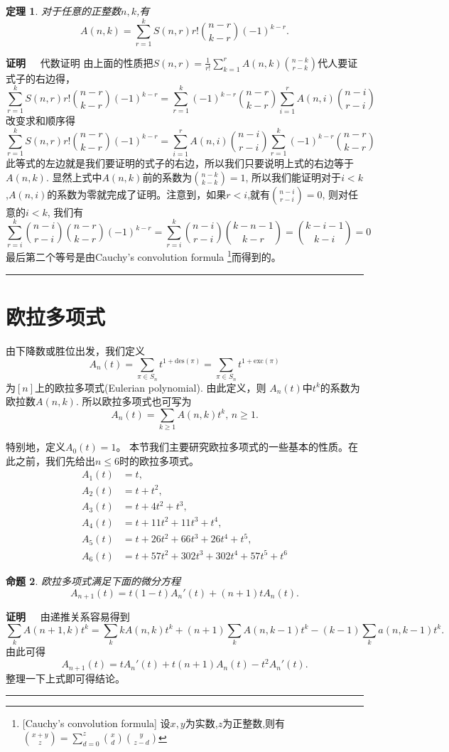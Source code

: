 \documentclass[a4paper,11pt,twoside]{book}
\newtheorem{thm}{定理}[section]
\newtheorem{prop}[thm]{命题}
\def\qed{\nopagebreak\hfill{\rule{4pt}{7pt}}\medbreak}
\def\pf{{\bf 证明~~ }}
\def \des{\mathrm{des}}
\def \exc{\mathrm{exc}}
\begin{document}
\begin{thm}
对于任意的正整数$n,k$,有
\begin{equation}
A(n,k)=\sum_{r=1}^{k}S(n,r)r!{n-r\choose k-r}(-1)^{k-r}.
\end{equation}
\end{thm}

\pf{代数证明}
由上面的性质把$S(n,r)=\frac{1}{r!}\sum_{k=1}^{r}A(n,k){n-k\choose
r-k}$代人要证式子的右边得，
$$\sum_{r=1}^{k}S(n,r)r!{n-r\choose k-r}(-1)^{k-r}=\sum_{r=1}^{k}(-1)^{k-r}{n-r\choose k-r}\sum_{i=1}^{r}A(n,i){n-i\choose
r-i}$$ 改变求和顺序得
$$\sum_{r=1}^{k}S(n,r)r!{n-r\choose k-r}(-1)^{k-r}=\sum_{i=1}^{r}A(n,i){n-i\choose r-i}\sum_{r=1}^{k}(-1)^{k-r}{n-r\choose
k-r}$$
此等式的左边就是我们要证明的式子的右边，所以我们只要说明上式的右边等于$A(n,k)$.
显然上式中$A(n,k)$前的系数为${n-k\choose k-k}=1$,
所以我们能证明对于$i<k$,$A(n,i)$的系数为零就完成了证明。注意到，如果$r<i$,就有${n-i\choose
r-i}=0$, 则对任意的$i<k$, 我们有
$$\sum_{r=i}^{k}{n-i\choose r-i}{n-r\choose k-r}(-1)^{k-r}=\sum_{r=i}^{k}{n-i\choose r-i}{k-n-1\choose k-r}={k-i-1\choose k-i}=0$$
最后第二个等号是由Cauchy's convolution formula \footnote{[Cauchy's
convolution formula] 设$x,y$为实数,$z$为正整数,则有${x+y\choose
z}=\sum_{d=0}^{z}{x\choose d}{y\choose z-d}$}而得到的。\qed






\section{欧拉多项式}
由下降数或胜位出发，我们定义
$$A_n(t)=\sum_{\pi\in S_n}t^{1+\des(\pi)}=
\sum_{\pi\in S_n}t^{1+\exc(\pi)}$$ 为$[n]$上的欧拉多项式(Eulerian
polynomial). 由此定义，则 $A_n(t)$中$t^{k}$的系数为欧拉数$A(n,k)$.
所以欧拉多项式也可写为 \[A_n(t)=\sum_{k\geq 1}A(n,k)t^k,\,n\geq1.\]

特别地，定义$A_0(t)=1$。
本节我们主要研究欧拉多项式的一些基本的性质。在此之前，我们先给出$n\leq
6$时的欧拉多项式。
\begin{align*}
A_1(t) &=t, \\[5pt]
A_2(t) &=t+t^2, \\[5pt]
A_3(t) &=t+4t^2+t^3, \\[5pt]
A_4(t) &=t+11t^2+11t^3+t^4,\\[5pt]
A_5(t) &=t+26t^2+66t^3+26t^4+t^5, \\[5pt]
A_6(t) &=t+57t^2+302t^3+302t^4+57t^5+t^6
\end{align*}

\begin{prop}\label{epd}
欧拉多项式满足下面的微分方程
\begin{equation}
A_{n+1}(t)=t(1-t)A_n'(t)+(n+1)tA_n(t).
\end{equation}
\end{prop}
\pf 由递推关系容易得到
\[
\sum_{k}A(n+1,k)t^k=\sum_{k}kA(n,k)t^k+(n+1)\sum_kA(n,k-1)t^k-(k-1)\sum_{k}a(n,k-1)t^k.\]
由此可得
\[A_{n+1}(t)=tA_n'(t)+t(n+1)A_n(t)-t^2A_n'(t).\]
整理一下上式即可得结论。\qed
\end{document}
